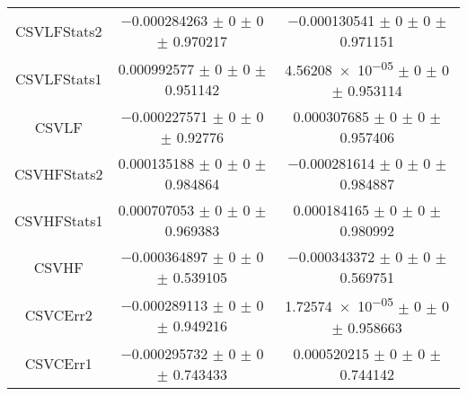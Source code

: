 \begin{table}
\begin{tabular}{ccc}
CSVLFStats2 	& \num{-0.000284263} $\pm$ \num{0} $\pm$ \num{0} $\pm$ \num{0.970217} 	& \num{-0.000130541} $\pm$ \num{0} $\pm$ \num{0} $\pm$ \num{0.971151}\\
CSVLFStats1 	& \num{0.000992577} $\pm$ \num{0} $\pm$ \num{0} $\pm$ \num{0.951142} 	& \num{4.56208e-05} $\pm$ \num{0} $\pm$ \num{0} $\pm$ \num{0.953114}\\
CSVLF 	& \num{-0.000227571} $\pm$ \num{0} $\pm$ \num{0} $\pm$ \num{0.92776} 	& \num{0.000307685} $\pm$ \num{0} $\pm$ \num{0} $\pm$ \num{0.957406}\\
CSVHFStats2 	& \num{0.000135188} $\pm$ \num{0} $\pm$ \num{0} $\pm$ \num{0.984864} 	& \num{-0.000281614} $\pm$ \num{0} $\pm$ \num{0} $\pm$ \num{0.984887}\\
CSVHFStats1 	& \num{0.000707053} $\pm$ \num{0} $\pm$ \num{0} $\pm$ \num{0.969383} 	& \num{0.000184165} $\pm$ \num{0} $\pm$ \num{0} $\pm$ \num{0.980992}\\
CSVHF 	& \num{-0.000364897} $\pm$ \num{0} $\pm$ \num{0} $\pm$ \num{0.539105} 	& \num{-0.000343372} $\pm$ \num{0} $\pm$ \num{0} $\pm$ \num{0.569751}\\
CSVCErr2 	& \num{-0.000289113} $\pm$ \num{0} $\pm$ \num{0} $\pm$ \num{0.949216} 	& \num{1.72574e-05} $\pm$ \num{0} $\pm$ \num{0} $\pm$ \num{0.958663}\\
CSVCErr1 	& \num{-0.000295732} $\pm$ \num{0} $\pm$ \num{0} $\pm$ \num{0.743433} 	& \num{0.000520215} $\pm$ \num{0} $\pm$ \num{0} $\pm$ \num{0.744142}\\
\bottomrule
\end{tabular}
\end{table}